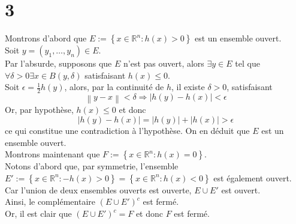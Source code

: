 \documentclass[11pt, a4paper]{article}
\newcommand\N[1]{\left\lVert#1\right\rVert}
\begin{document}
\section*{3}
Montrons d'abord que $ E:= \left\{ x \in \mathbb{R}^n: h( x) >0 \right\} $ est un ensemble ouvert.\\
Soit $ y= ( y_1, \ldots, y_n)  \in E$.\\
Par l'absurde, supposons que $E$ n'est pas ouvert, alors $\exists y \in E $ tel que $\forall \delta>0 \exists x \in B( y,\delta)$ satisfaisant $h( x) \leq 0$.\\
Soit $\epsilon= \frac{1}{2}h( y) $, alors, par la continuité de $h$, il existe $\delta>0$, satisfaisant
\[ 
	\N{y-x} < \delta \Rightarrow |h( y) -h( x)| < \epsilon
\]
Or, par hypothèse, $h( x) \leq 0$ et donc
\[ 
	|h( y) - h( x) | = |h( y) | + |h( x) | > \epsilon
\]
ce qui constitue une contradiction à l'hypothèse. On en déduit que $E$ est un ensemble ouvert.\\

Montrons maintenant que $ F:= \left\{ x \in \mathbb{R}^n: h( x) =0 \right\} $.\\
Notons d'abord que, par symmetrie, l'ensemble $ E':= \left\{ x \in \mathbb{R}^n: -h( x) >0 \right\} = \left\{ x \in \mathbb{R}^n: h( x) <0 \right\} $ est également ouvert.\\
Car l'union de deux ensembles ouverts est ouverte, $E \cup E'$ est ouvert.\\
Ainsi, le complémentaire $( E \cup E')^{c}$ est fermé.\\
Or, il est clair que $( E \cup E')^{c}= F $ et donc $F$ est fermé.
\end{document}
